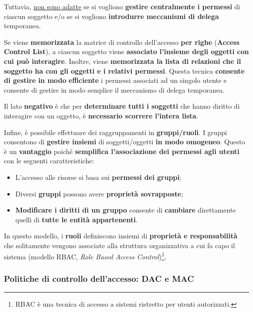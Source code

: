 \documentclass[a4paper]{article}
\begin{document}
	Tuttavia, \underline{non sono adatte} se si vogliono \textbf{gestire centralmente i permessi} di ciascun soggetto e/o se si vogliono \textbf{introdurre meccanismi di delega} temporanea.\newline
	
	\noindent
	Se viene \textbf{memorizzata} la matrice di controllo dell'accesso \textbf{per righe} (\textcolor{Red3}{\textbf{Access Control List}}), a ciascun soggetto viene \textbf{associato l'insieme degli oggetti con cui può interagire}. Inoltre, viene \textbf{memorizzata la lista di relazioni che il soggetto ha con gli oggetti e i relativi permessi}. Questa tecnica \textbf{consente di gestire in modo} \textcolor{Green4}{\textbf{efficiente}} i permessi associati ad un singolo utente e consente di gestire in modo semplice il meccanismo di delega temporanea.
	
	Il lato \textbf{negativo} è che per \textbf{determinare tutti i soggetti} che hanno diritto di interagire con un oggetto, è \textbf{necessario scorrere l'intera lista}.\newline
	
	\noindent
	Infine, è possibile effettuare dei raggruppamenti in \textcolor{Red3}{\textbf{gruppi/ruoli}}. I gruppi consentono di \textbf{gestire insiemi} di soggetti/oggetti \textbf{in modo omogeneo}. Questo è un \textcolor{Green4}{\textbf{vantaggio}} poiché \textbf{semplifica l'associazione dei permessi agli utenti} con le seguenti caratteristiche:
	\begin{itemize}
		\item L'accesso alle risorse si basa sui \textbf{permessi dei gruppi};
		
		\item Diversi \textbf{gruppi} possono avere \textbf{proprietà sovrapposte};
		
		\item \textbf{Modificare i diritti di un gruppo} consente di \textbf{cambiare} direttamente quelli di \textbf{tutte le entità appartenenti}.
	\end{itemize}
	In questo modello, i \textbf{ruoli} definiscono insiemi di \textbf{proprietà e responsabilità} che solitamente vengono associate alla struttura organizzativa a cui fa capo il sistema (modello RBAC, \emph{Role Based Access Control})\footnote{RBAC è una tecnica di accesso a sistemi ristretto per utenti autorizzati.}.\newpage
	
	\subsubsection{Politiche di controllo dell'accesso: DAC e MAC}\label{politiche di controllo dell'accesso: DAC e MAC}
	
\end{document}
